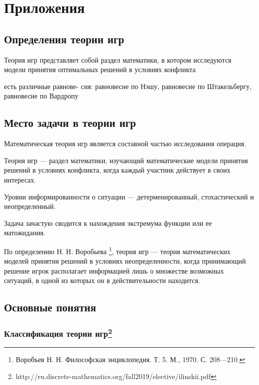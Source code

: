 \chapter{Приложения}

\section*{Определения теории игр}

Теория игр представляет собой раздел математики, в котором исследуются модели принятия оптимальных решений в условиях конфликта \cite{mazalov2017}


есть различные равнове- сия: равновесие по Нэшу, равновесие по Штакельбергу, равновесие по Вардропу\cite[4]{mazalov2017}

\section{Место задачи в теории игр}

Математическая теория игр является составной частью исследования операция. \cite{petrosyan}

Теория игр --- раздел математики, изучающий математические модели принятия решений в условиях конфликта, когда каждый участник действует в своих интересах. \cite[7]{petrosyan}

Уровни информированности о ситуации --- детерменированный, стохастический и неопределенный.

Задача зачастую сводится к нахождения экстремума функции или ее матожидания.

По определению Н. Н. Воробьева \footnote{Воробъев Н. Н. Философская энциклопедия. Т. 5. М., 1970. С. 208—210.}, теория игр --- теория математических моделей принятия решений в условиях неопределенности, когда принимающий решение игрок располагает информацией лишь о множестве возможных ситуаций, в одной из которых он в действительности находится.




\section{Основные понятия}

\subsection*{Классификация теории игр\footnote{http://ru.discrete-mathematics.org/fall2019/elective/ilinskii.pdf}\cite[223]{Association:2018aa}}

